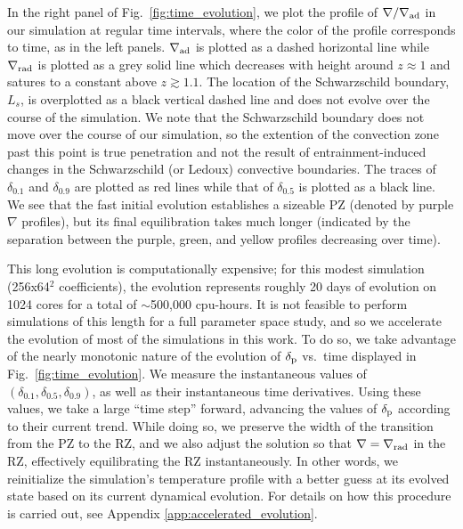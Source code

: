 \documentclass[twocolumn]{aastex631}
\newcommand{\gradrad}{\ensuremath{\nabla_{\rm{rad}}}}
\newcommand{\gradad}{\ensuremath{\nabla_{\rm{ad}}}}
\newcommand{\justgrad}{\ensuremath{\nabla}}
\newcommand{\delp}{\ensuremath{\delta_{\rm{p}}}}
\begin{document}
In the right panel of Fig.~\ref{fig:time_evolution}, we plot the profile of $\justgrad/\gradad$ in our simulation at regular time intervals, where the color of the profile corresponds to time, as in the left panels.
$\gradad$ is plotted as a dashed horizontal line while $\gradrad$ is plotted as a grey solid line which decreases with height around $z \approx 1$ and satures to a constant above $z \gtrsim 1.1$.
The location of the Schwarzschild boundary, $L_s$, is overplotted as a black vertical dashed line and does not evolve over the course of the simulation.
We note that the Schwarzschild boundary does not move over the course of our simulation, so the extention of the convection zone past this point is true penetration and not the result of entrainment-induced changes in the Schwarzschild (or Ledoux) convective boundaries.
The traces of $\delta_{0.1}$ and $\delta_{0.9}$ are plotted as red lines while that of $\delta_{0.5}$ is plotted as a black line.
We see that the fast initial evolution establishes a sizeable PZ (denoted by purple $\justgrad$ profiles), but its final equilibration takes much longer (indicated by the separation between the purple, green, and yellow profiles decreasing over time).

This long evolution is computationally expensive; for this modest simulation (256x64$^2$ coefficients), the evolution represents roughly 20 days of evolution on 1024 cores for a total of $\sim$500,000 cpu-hours.
It is not feasible to perform simulations of this length for a full parameter space study, and so we accelerate the evolution of most of the simulations in this work.
To do so, we take advantage of the nearly monotonic nature of the evolution of $\delp$ vs.~time displayed in Fig.~\ref{fig:time_evolution}.
We measure the instantaneous values of $(\delta_{0.1}, \delta_{0.5}, \delta_{0.9})$, as well as their instantaneous time derivatives.
Using these values, we take a large ``time step'' forward, advancing the values of $\delp$ according to their current trend.
While doing so, we preserve the width of the transition from the PZ to the RZ, and we also adjust the solution so that $\justgrad = \gradrad$ in the RZ, effectively equilibrating the RZ instantaneously.
In other words, we reinitialize the simulation's temperature profile with a better guess at its evolved state based on its current dynamical evolution.
For details on how this procedure is carried out, see Appendix \ref{app:accelerated_evolution}.
\end{document}
